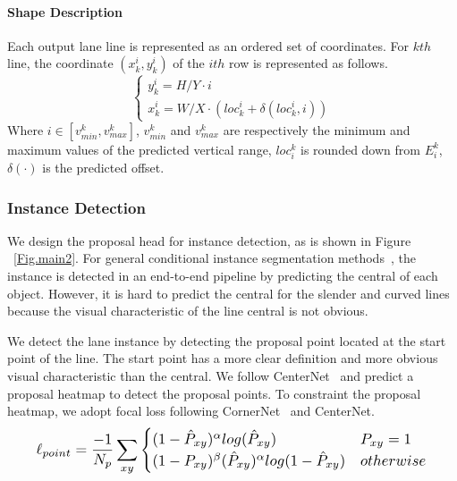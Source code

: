 \documentclass[10pt,twocolumn,letterpaper]{article}
\begin{document}
\paragraph{Shape Description}
Each output lane line is represented as an ordered set of coordinates.
For \(kth\) line, the coordinate \((x_k^i, y_k^i)\) of the \(ith\) row is represented as follows.
\begin{equation}
    \displaystyle
    \left\{\begin{array}{l}
    y_k^i=H/Y\cdot i 
    \\
    x_k^i=W/X \cdot (loc_k^i+\delta (loc_k^i, i))
    
\end{array}\right.
\end{equation}Where \(i\in \left [ v_{min}^{k}, v_{max}^{k} \right ]\), \(v_{min}^{k}\) and \(v_{max}^{k}\) are respectively the minimum and maximum values of the predicted vertical range,
\(loc_{i}^{k}\) is rounded down from \(E_{i}^{k}\), \(\delta(\cdot)\) is the predicted offset. 

\subsubsection{Instance Detection}
We design the proposal head for instance detection, as is shown in Figure ~\ref{Fig.main2}.
For general conditional instance segmentation methods~\cite{tian2020conditional, wang2020solov2}, the instance is detected in an end-to-end pipeline by predicting the central of each object. 
However, it is hard to predict the central for the slender and curved lines because the visual characteristic of the line central is not obvious.

We detect the lane instance by detecting the proposal point located at the start point of the line. The start point has a more clear definition and more obvious visual characteristic than the central. We follow CenterNet~\cite{duan2019centernet} and predict a proposal heatmap to detect the proposal points.
To constraint the proposal heatmap, we adopt focal loss following CornerNet~\cite{law2018cornernet} and CenterNet\cite{duan2019centernet}.
\begin{equation}
\resizebox{.91\linewidth}{!}{$
    \displaystyle
    \ell_{point}=\frac{-1}{N_p}\sum_{xy}^{}\begin{cases} (1-\hat{P}_{xy})^\alpha  log(\hat{P}_{xy})&{P_{xy}=1} \\
    (1-P_{xy})^\beta({\hat{P}_{xy}})^{\alpha}log(1-\hat{P}_{xy})   & otherwise
\end{cases}
$}
\end{equation}
\end{document}
